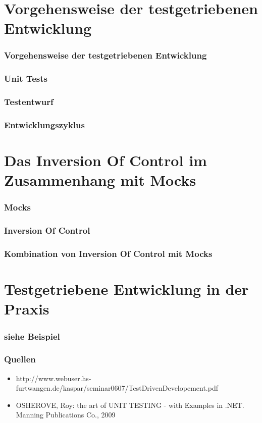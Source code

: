 \documentclass{beamer}
\begin{document}
\section{Vorgehensweise der testgetriebenen Entwicklung}
\begin{frame}
\frametitle{Vorgehensweise der testgetriebenen Entwicklung}
\end{frame}

\begin{frame}
\frametitle{Unit Tests}
\end{frame}

\begin{frame}
\frametitle{Testentwurf}
\end{frame}

\begin{frame}
\frametitle{Entwicklungszyklus}
\end{frame}

\section{Das Inversion Of Control im Zusammenhang mit Mocks}
\begin{frame}
\frametitle{Mocks}
\end{frame}

\begin{frame}
\frametitle{Inversion Of Control}
\end{frame}

\begin{frame}
\frametitle{Kombination von Inversion Of Control mit Mocks}
\end{frame}

\section{Testgetriebene Entwicklung in der Praxis}
\begin{frame}
\frametitle{siehe Beispiel}
\end{frame}

\begin{appendix}
\begin{frame}
\frametitle{Quellen}
\begin{itemize}
\item http://www.webuser.hs-furtwangen.de/kaspar/seminar0607/TestDrivenDevelopement.pdf
\item OSHEROVE, Roy: the art of UNIT TESTING - with Examples in .NET. Manning Publications Co., 2009
\end{itemize}
\end{frame}
\end{appendix}
\end{document}
